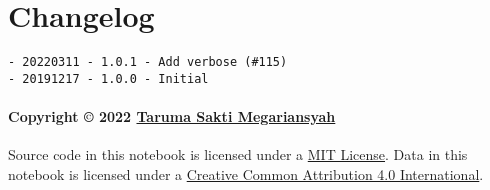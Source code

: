 \documentclass[11pt]{article}
\begin{document}
    \hypertarget{changelog}{%
\section{Changelog}\label{changelog}}

\begin{verbatim}
- 20220311 - 1.0.1 - Add verbose (#115)
- 20191217 - 1.0.0 - Initial
\end{verbatim}

\hypertarget{copyright-2022-taruma-sakti-megariansyah}{%
\paragraph{\texorpdfstring{Copyright © 2022
\href{https://taruma.github.io}{Taruma Sakti
Megariansyah}}{Copyright © 2022 Taruma Sakti Megariansyah}}\label{copyright-2022-taruma-sakti-megariansyah}}

Source code in this notebook is licensed under a
\href{https://choosealicense.com/licenses/mit/}{MIT License}. Data in
this notebook is licensed under a
\href{https://creativecommons.org/licenses/by/4.0/}{Creative Common
Attribution 4.0 International}.


    
    
    
\end{document}
